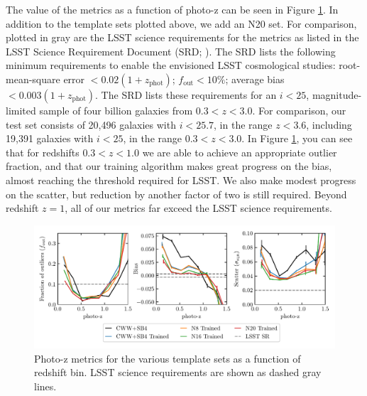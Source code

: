 The value of the metrics as a function of photo-z can be seen in Figure \ref{fig:photoz_binned}.
In addition to the template sets plotted above, we add an N20 set.
For comparison, plotted in gray are the LSST science requirements for the metrics as listed in the LSST Science Requirement Document (SRD; \citealt{Ivezic2018}).
The SRD lists the following minimum requirements to enable the envisioned LSST cosmological studies: root-mean-square error $< 0.02(1+z_\text{phot})$; $f_\text{out} < 10\%$; average bias $<0.003(1+z_\text{phot})$.
The SRD lists these requirements for an $i<25$, magnitude-limited sample of four billion galaxies from $0.3 < z < 3.0$.
For comparison, our test set consists of 20,496 galaxies with $i < 25.7$, in the range $z < 3.6$, including 19,391 galaxies with $i < 25$, in the range $0.3 < z < 3.0$.
In Figure \ref{fig:photoz_binned}, you can see that for redshifts $0.3 < z < 1.0$ we are able to achieve an appropriate outlier fraction, and that our training algorithm makes great progress on the bias, almost reaching the threshold required for LSST.
We also make modest progress on the scatter, but reduction by another factor of two is still required.
Beyond redshift $z=1$, all of our metrics far exceed the LSST science requirements.

\begin{figure}
    \centering
    \includegraphics{figures/photoz_binned_metrics.pdf}
    \caption{Photo-z metrics for the various template sets as a function of redshift bin. LSST science requirements are shown as dashed gray lines.}
    \label{fig:photoz_binned}
\end{figure}